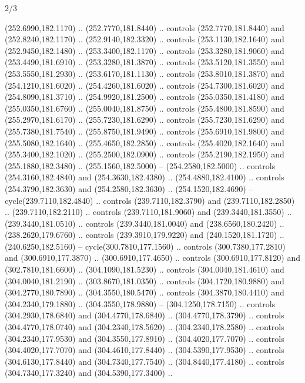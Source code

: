 \begin{flagdescription}{2/3}
\begin{scope}[xshift=0.5\flaglength,yshift=0.5\flagwidth,scale=\flagwidth/259.2]
\begin{scope}[y=0.8pt, x=0.8pt, yscale=-1,shift={(-243,-162)}]
      (252.6990,182.1170) .. (252.7770,181.8440) .. controls (252.7770,181.8440) and
      (252.8240,182.1170) .. (252.9140,182.3320) .. controls (253.1130,182.1640) and
      (252.9450,182.1480) .. (253.3400,182.1170) .. controls (253.3280,181.9060) and
      (253.4490,181.6910) .. (253.3280,181.3870) .. controls (253.5120,181.3550) and
      (253.5550,181.2930) .. (253.6170,181.1130) .. controls (253.8010,181.3870) and
      (254.1210,181.6020) .. (254.4260,181.6020) .. controls (254.7300,181.6020) and
      (254.8090,181.3710) .. (254.9920,181.2500) .. controls (255.0350,181.4180) and
      (255.0350,181.6760) .. (255.0040,181.8750) .. controls (255.4800,181.8590) and
      (255.2970,181.6170) .. (255.7230,181.6290) .. controls (255.7230,181.6290) and
      (255.7380,181.7540) .. (255.8750,181.9490) .. controls (255.6910,181.9800) and
      (255.5080,182.1640) .. (255.4650,182.2850) .. controls (255.4020,182.1640) and
      (255.3400,182.1020) .. (255.2500,182.0900) .. controls (255.2190,182.1950) and
      (255.1880,182.3480) .. (255.1560,182.5000) -- (254.2580,182.5000) .. controls
      (254.3160,182.4840) and (254.3630,182.4380) .. (254.4880,182.4100) .. controls
      (254.3790,182.3630) and (254.2580,182.3630) .. (254.1520,182.4690) --
      cycle(239.7110,182.4840) .. controls (239.7110,182.3790) and
      (239.7110,182.2850) .. (239.7110,182.2110) .. controls (239.7110,181.9060) and
      (239.3440,181.3550) .. (239.3440,181.0510) .. controls (239.3440,181.0040) and
      (238.6560,180.2420) .. (238.2620,179.6760) .. controls (239.3910,179.9220) and
      (240.1520,181.1720) .. (240.6250,182.5160) -- cycle(300.7810,177.1560) ..
      controls (300.7380,177.2810) and (300.6910,177.3870) .. (300.6910,177.4650) ..
      controls (300.6910,177.8120) and (302.7810,181.6600) .. (304.1090,181.5230) ..
      controls (304.0040,181.4610) and (304.0040,181.2190) .. (303.8670,181.0350) ..
      controls (304.1720,180.9880) and (304.2770,180.7890) .. (304.3550,180.5470) ..
      controls (304.3870,180.4410) and (304.2340,179.1880) .. (304.3550,178.9880) --
      (304.1250,178.7150) .. controls (304.2930,178.6840) and (304.4770,178.6840) ..
      (304.4770,178.3790) .. controls (304.4770,178.0740) and (304.2340,178.5620) ..
      (304.2340,178.2580) .. controls (304.2340,177.9530) and (304.3550,177.8910) ..
      (304.4020,177.7070) .. controls (304.4020,177.7070) and (304.4610,177.8440) ..
      (304.5390,177.9530) .. controls (304.6130,177.8440) and (304.7340,177.7540) ..
      (304.8440,177.4180) .. controls (304.7340,177.3240) and (304.5390,177.3400) ..

\end{scope}
\end{scope}
\end{flagdescription}
